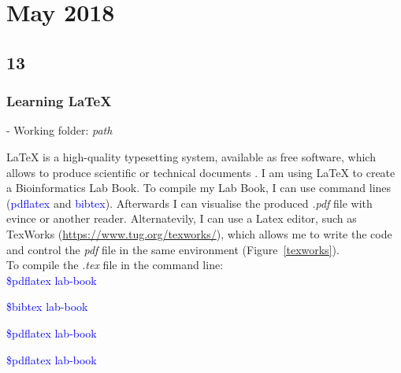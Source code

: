 \documentclass[12pt, a4paper]{report}
\title{\titulo}
\author{\autor}
\date{2018}
\newcommand{\command}[1]{\textcolor{blue}{#1}}
\begin{document}
 \maketitle
 \tableofcontents
 \newpage


 \chapter{May 2018}
 
 \section{13}
 \subsection{Learning \LaTeX}
 \hspace{0.2cm}
 \begin{tcolorbox}[width=6.3in]
 \scriptsize 
 - Working folder: \textit{path}
 \end{tcolorbox}
 \hspace{0.2cm}
 \normalsize  
 
  \LaTeX{} is a high-quality typesetting system, available as free software, which allows to produce scientific or technical documents \cite{latex-main}. I am using \LaTeX{} to create a Bioinformatics Lab Book. To compile my Lab Book, I can use command lines (\command{pdflatex} and \command{bibtex}). Afterwards I can visualise the produced {\it .pdf} file with evince or another reader. Alternatevily, I can use a Latex editor, such as TexWorks (\url{https://www.tug.org/texworks/}), which allows me to write the code and control the {\it pdf} file in the same environment (Figure~\ref{texworks}).  \\
  
  
  To compile the {\it .tex} file in the command line: \\
  
  \command{\$pdflatex lab-book}
  
  \command{\$bibtex lab-book}
  
  \command{\$pdflatex lab-book}
    
  \command{\$pdflatex lab-book} \\
  
\end{document}
